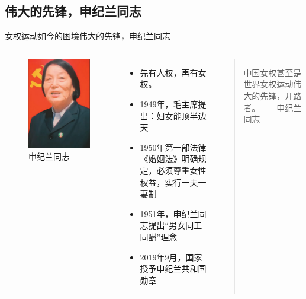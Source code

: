 \documentclass{beamer}
\begin{document}
	\subsection*{伟大的先锋，申纪兰同志}
	\begin{frame}{女权运动如今的困境}{伟大的先锋，申纪兰同志}
		\begin{columns}
			\begin{figure}
				\centering
				\includegraphics[width=\textwidth]{img/图片5.png}
				\caption{申纪兰同志}
			\end{figure}

			\begin{itemize}
				\item 先有人权，再有女权。
				\item 1949年，毛主席提出：妇女能顶半边天
				\item 1950年第一部法律《婚姻法》明确规定，必须尊重女性权益，实行一夫一妻制
				\item 1951年，申纪兰同志提出“男女同工同酬”理念
				\item 2019年9月，国家授予申纪兰共和国勋章 
			\end{itemize}

			\begin{quotation}
				中国女权甚至是世界女权运动伟大的先锋，开路者。——申纪兰同志
			\end{quotation}
		\end{columns}
	\end{frame}
\end{document}
